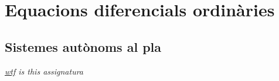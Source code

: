 \documentclass[../Apunts.tex]{subfiles}
\begin{document}
\part{Equacions diferencials ordinàries }
\chapter{Sistemes autònoms al pla}
	\emph{\hypersetup{urlcolor=black}\href{https://www.urbandictionary.com/define.php?term=wtf}{wtf} is this assignatura}
	
\end{document}
